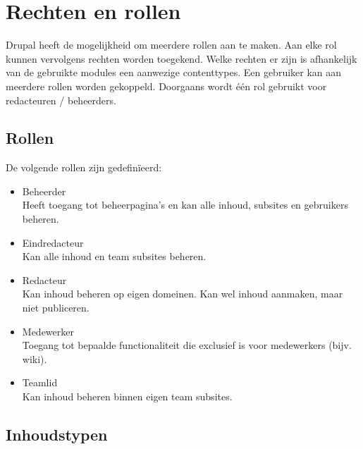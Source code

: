 \section{Rechten en rollen}

Drupal heeft de mogelijkheid om meerdere rollen aan te maken. Aan elke rol kunnen vervolgens rechten worden toegekend. Welke rechten er zijn is afhankelijk van de gebruikte modules een aanwezige contenttypes. Een gebruiker kan aan meerdere rollen worden gekoppeld. Doorgaans wordt \'{e}\'{e}n rol gebruikt voor redacteuren / beheerders.

\subsection{Rollen}

De volgende rollen zijn gedefin\"{i}eerd:
\begin{itemize}
\item Beheerder \\
	Heeft toegang tot beheerpagina's en kan alle inhoud, subsites en gebruikers beheren.
\item Eindredacteur \\
	Kan alle inhoud en team subsites beheren.
\item Redacteur \\
	Kan inhoud beheren op eigen domeinen. Kan wel inhoud aanmaken, maar niet publiceren.
\item Medewerker \\
	Toegang tot bepaalde functionaliteit die exclusief is voor medewerkers (bijv. wiki).
\item Teamlid \\
	Kan inhoud beheren binnen eigen team subsites.
\end{itemize}

\subsection{Inhoudstypen}

